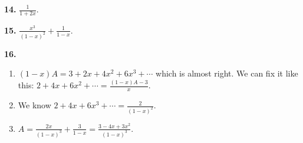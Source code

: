 \documentclass[10pt,]{book}
\theoremstyle{plain}
\theoremstyle{definition}
\theoremstyle{definition}
\theoremstyle{definition}
\numberwithin{equation}{chapter}
\begin{document}
\par\smallskip
\noindent\textbf{14.}\quad{}
\(\frac{1}{1+2x}\).
%
\par\smallskip
\noindent\textbf{15.}\quad{}
\(\frac{x^3}{(1-x)^2} + \frac{1}{1-x}\).
%
\par\smallskip
\noindent\textbf{16.}\quad{}\leavevmode%
\begin{enumerate}[label=(\alph*)]
\item\hypertarget{li-1367}{}\((1-x)A = 3 + 2x + 4x^2 + 6x^3 + \cdots\) which is almost right.  We can fix it like this:
		 \(2 + 4x + 6x^2 + \cdots = \frac{(1-x)A - 3}{x}\).%
\item\hypertarget{li-1368}{}
We know \(2 + 4x + 6x^3 + \cdots = \frac{2}{(1-x)^2}\).
%
\item\hypertarget{li-1369}{}\(A = \frac{2x}{(1-x)^3} + \frac{3}{1-x} = \frac{3 -4x + 3x^2}{(1-x)^3}\).%
\end{enumerate}
\par\smallskip
\end{document}
